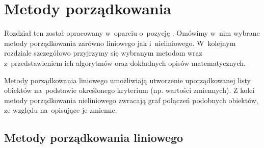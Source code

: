 \documentclass[12pt,a4paper]{report}
\newtheorem{definition}[theorem]{Definicja}
\newtheorem{example}{Przykład}
\begin{document}
%


\chapter{Metody porządkowania}\label{metody porzadkowania}
Rozdział ten został opracowany w~oparciu o~pozycję \cite[Rozdział 2]{panek2013}. Omówimy w~nim wybrane metody porządkowania zarówno liniowego jak i~nieliniowego. W~kolejnym rozdziale szczegółowo przyjrzymy się wybranym metodom wraz z~przedstawieniem ich algorytmów oraz dokładnych opisów matematycznych. 

Metody porządkowania liniowego umożliwiają utworzenie uporządkowanej listy obiektów na~podstawie określonego kryterium (np. wartości zmiennych). 
Z kolei metody porządkowania nieliniowego zwracają graf połączeń podobnych obiektów, ze względu na~opisujące je zmienne. 

\section{Metody porządkowania liniowego}
\end{document}
